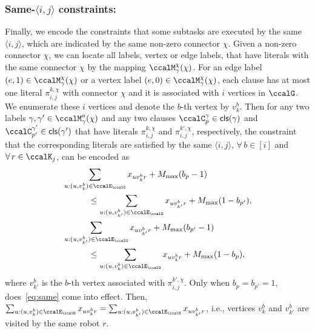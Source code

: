 \documentclass[Afour,sageh,times]{sagej}
\newcommand{\clause}[1]{\mathsf{cls}(#1)}
\newcommand{\ag}[2]{\langle#1,#2\rangle}
\newcommand{\aap}[4]{\mathcal{\pi}_{{#1},{#2}}^{#3,#4}}
\begin{document}
{{{\subsubsection{Same-$\ag{i}{j}$ constraints:}\label{sec:samegroup}
Finally, we encode the constraints that some subtasks are executed by the same $\ag{i}{j}$, which are indicated by the same non-zero connector $\chi$. Given a non-zero connector $\chi$, we can locate all labels, vertex or edge labels, that have literals with the same connector $\chi$  by the mapping $\ccalM_\mathsf{\gamma}^\chi(\chi)$. For an edge label $(e, 1)  \in  \ccalM_\mathsf{\gamma}^\chi(\chi)$ or a vertex label $(e, 0)  \in  \ccalM_\mathsf{\gamma}^\chi(\chi)$, each clause has at most one literal $\aap{i}{j}{k}{\chi}$ with connector $\chi$ and it is associated with $i$ vertices in $\ccalG$. We enumerate these $i$ vertices and denote the $b$-th vertex by $v_k^b$. Then for any two labels $\gamma, \gamma'\in\ccalM_\mathsf{\gamma}^a(\chi)$ and any two clauses $\ccalC_p^\gamma \in \clause{\gamma}$ and $\ccalC_{p'}^{\gamma'} \in \clause{{\gamma'}}$ that have  literals $\aap{i}{j}{k}{\chi}$ and $\aap{i}{j}{k'}{\chi}$, respectively, {the constraint} that the corresponding literals are satisfied by the same $\ag{i}{j}$, $\forall \,b \in [i]$ and  $\forall \, r \in \ccalK_j$, can be encoded as
\begingroup\makeatletter\def\f@size{10}\check@mathfonts
\def\maketag@@@#1{\hbox{\m@th\normalsize\normalfont#1}}%
\begin{subequations}\label{eq:same}
  \begin{align}
    & \sum_{u:(u, v_k^b) \in \ccalE_\ccalG} x_{u v_k^b r} + M_{\text{max}} (b_p - 1) \nonumber \\& \quad\quad\quad \leq  \sum_{u:(u, v_{k'}^b) \in \ccalE_\ccalG} x_{u v_{k'}^b r} + M_{\text{max}}(1 - b_{p'}),\\
    & \sum_{u:(u, v_{k'}^b) \in \ccalE_\ccalG} x_{u v_{k'}^b r} + M_{\text{max}} (b_{p'} - 1) \nonumber \\& \quad\quad\quad \leq \sum_{u:(u, v_{k}^b) \in \ccalE_\ccalG} x_{u v_{k}^b r} + M_{\text{max}}(1 - b_{p}),
  \end{align}
\end{subequations}
\endgroup
where $v_{k'}^b$ is the $b$-th vertex associated with $\aap{i}{j}{k'}{\chi}$. Only when $b_p = b_{p'}=1$, does~\eqref{eq:same} come into effect. Then, $\sum\nolimits_{u:(u, v_k^b) \in \ccalE_\ccalG} x_{u v_k^b r} = \sum\nolimits_{u:(u, v_{k'}^b) \in \ccalE_\ccalG} x_{u v_{k'}^b r} $, i.e., vertices $v_k^b$ and $v_{k'}^b$ are visited by the same robot $r$.

}}}
\end{document}
